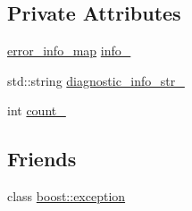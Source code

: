 \subsection*{Private Attributes}
\begin{DoxyCompactItemize}
\item 
\hyperlink{classecto_1_1except_1_1error__info__container__impl_a20b3846bc393224fe282eb64a40ee83d}{error\-\_\-info\-\_\-map} \hyperlink{classecto_1_1except_1_1error__info__container__impl_a8ec60b174805696bd691a894b7f4109f}{info\-\_\-}
\item 
std\-::string \hyperlink{classecto_1_1except_1_1error__info__container__impl_aeb86496a5127e19e9f787e77531b1b83}{diagnostic\-\_\-info\-\_\-str\-\_\-}
\item 
int \hyperlink{classecto_1_1except_1_1error__info__container__impl_ade4abdc4aa11c62dd39847bc4f6c619c}{count\-\_\-}
\end{DoxyCompactItemize}
\subsection*{Friends}
\begin{DoxyCompactItemize}
\item 
class \hyperlink{classecto_1_1except_1_1error__info__container__impl_a17667d5fc9c440eb33937b735d4fdfe6}{boost\-::exception}
\end{DoxyCompactItemize}


